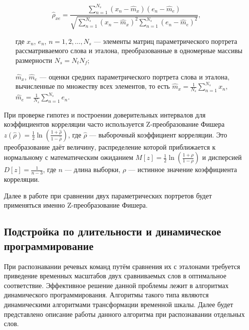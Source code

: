 \begin{equation}
\widehat{\rho}_{xe} = \frac{\sum_{n=1}^{N_s} (x_n - \widehat{m}_x)(e_n - \widehat{m}_e)}{\sqrt{\sum_{n=1}^{N_s} (x_n - \widehat{m}_x)^2 \sum_{n=1}^{N_s} (e_n - \widehat{m}_e)^2}},
\end{equation}
\begin{itemize}[align=left,leftmargin=1.8em,itemindent=0pt,labelsep=0pt,labelwidth=1.8em]
	\item[где] $x_n$, $e_n$, $n = 1, 2, \dots, N_s$ --- элементы матриц параметрического портрета рассматриваемого слова и эталона, преобразованные в одномерные массивы размерности $N_s = N_t N_f$;
	\item[] $\widehat{m}_x$, $\widehat{m}_e$ --- оценки средних параметрического портрета слова и эталона, вычисленные по множеству всех элементов, то есть 
	$\widehat{m}_x = \frac{1}{N_s} \sum_{n=1}^{N_s} x_n$, $\widehat{m}_e = \frac{1}{N_s} \sum_{n=1}^{N_s} e_n$.
\end{itemize}

При проверке гипотез и построении доверительных интервалов для коэффициентов корреляции часто используется Z-преобразование Фишера $z(\widehat{\rho}) = \frac{1}{2} \ln\left(\frac{1+\widehat{\rho}}{1-\widehat{\rho}}\right)$, где $\widehat{\rho}$ --- выборочный коэффициент корреляции.
Это преобразование даёт величину, распределение которой приближается к нормальному с математическим ожиданием $M[z] = \frac{1}{2} \ln\left(\frac{1+\rho}{1-\rho}\right)$ и дисперсией $D[z] = \frac{1}{n-3}$, где $n$ --- длина выборки, $\rho$ --- истинное значение коэффициента корреляции.

Далее в работе при сравнении двух параметрических портретов будет применяться именно Z-преобразование Фишера.


\subsection{Подстройка по длительности и динамическое программирование} \label{sect1_4_2}

При распознавании речевых команд путём сравнения их с эталонами требуется приведение временных масштабов двух сравниваемых слов в оптимальное соответствие.
Эффективное решение данной проблемы лежит в алгоритмах динамического программирования.
Алгоритмы такого типа являются динамическими алгоритмами трансформации временной шкалы.
Далее будет представлено описание работы данного алгоритма при распознавании отдельных слов.

